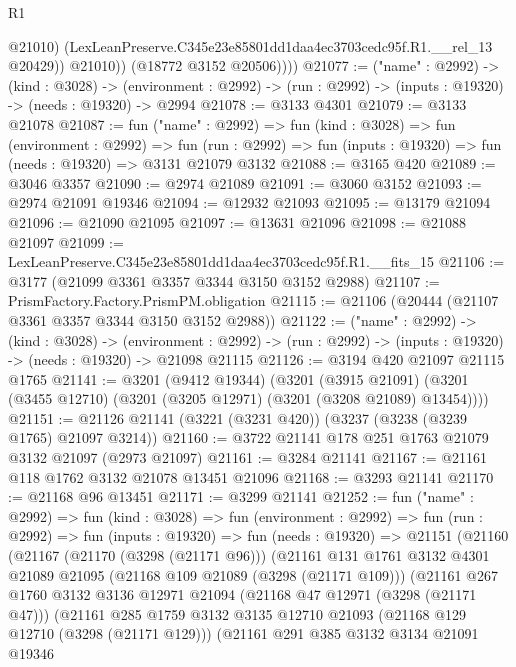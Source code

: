 \begin{lexlean}{R1}
\begin{coremodule}
                  @21010)
                (LexLeanPreserve.C345e23e85801dd1daa4ec3703cedc95f.R1.__rel_13 @20429))
              @21010))
          (@18772 @3152 @20506))))
@21077 := ("name" : @2992) ->
  (kind : @3028) ->
  (environment : @2992) -> (run : @2992) -> (inputs : @19320) -> (needs : @19320) -> @2994
@21078 := @3133 @4301
@21079 := @3133 @21078
@21087 := fun ("name" : @2992) =>
  fun (kind : @3028) =>
  fun (environment : @2992) =>
  fun (run : @2992) => fun (inputs : @19320) => fun (needs : @19320) => @3131 @21079 @3132
@21088 := @3165 @420
@21089 := @3046 @3357
@21090 := @2974 @21089
@21091 := @3060 @3152
@21093 := @2974 @21091 @19346
@21094 := @12932 @21093
@21095 := @13179 @21094
@21096 := @21090 @21095
@21097 := @13631 @21096
@21098 := @21088 @21097
@21099 := LexLeanPreserve.C345e23e85801dd1daa4ec3703cedc95f.R1.__fits_15
@21106 := @3177 (@21099 @3361 @3357 @3344 @3150 @3152 @2988)
@21107 := PrismFactory.Factory.PrismPM.obligation
@21115 := @21106 (@20444 (@21107 @3361 @3357 @3344 @3150 @3152 @2988))
@21122 := ("name" : @2992) ->
  (kind : @3028) ->
  (environment : @2992) -> (run : @2992) -> (inputs : @19320) -> (needs : @19320) -> @21098 @21115
@21126 := @3194 @420 @21097 @21115 @1765
@21141 := @3201
    (@9412 @19344)
    (@3201
      (@3915 @21091)
      (@3201 (@3455 @12710) (@3201 (@3205 @12971) (@3201 (@3208 @21089) @13454))))
@21151 := @21126 @21141 (@3221 (@3231 @420)) (@3237 (@3238 (@3239 @1765) @21097 @3214))
@21160 := @3722 @21141 @178 @251 @1763 @21079 @3132 @21097 (@2973 @21097)
@21161 := @3284 @21141
@21167 := @21161 @118 @1762 @3132 @21078 @13451 @21096
@21168 := @3293 @21141
@21170 := @21168 @96 @13451
@21171 := @3299 @21141
@21252 := fun ("name" : @2992) =>
  fun (kind : @3028) =>
  fun (environment : @2992) =>
  fun (run : @2992) =>
  fun (inputs : @19320) =>
  fun (needs : @19320) =>
  @21151
    (@21160
      (@21167
        (@21170 (@3298 (@21171 @96)))
        (@21161
          @131
          @1761
          @3132
          @4301
          @21089
          @21095
          (@21168 @109 @21089 (@3298 (@21171 @109)))
          (@21161
            @267
            @1760
            @3132
            @3136
            @12971
            @21094
            (@21168 @47 @12971 (@3298 (@21171 @47)))
            (@21161
              @285
              @1759
              @3132
              @3135
              @12710
              @21093
              (@21168 @129 @12710 (@3298 (@21171 @129)))
              (@21161
                @291
                @385
                @3132
                @3134
                @21091
                @19346

\end{coremodule}
\end{lexlean}
